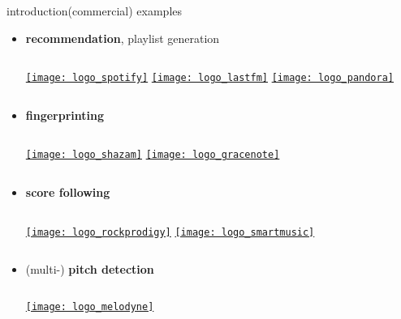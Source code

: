        \begin{frame}{introduction}{(commercial) examples}
            \begin{itemize}
                \item   \textbf{recommendation}, playlist generation
                    \begin{columns}
                            \href{https://www.spotify.com}{\texttt{[image: logo\_spotify]}}
                            \href{https://www.last.fm}{\texttt{[image: logo\_lastfm]}}
                            \href{https://www.pandora.com}{\texttt{[image: logo\_pandora]}}
                    \end{columns}
                \bigskip
                \item<1->   \textbf{fingerprinting} 
                    \begin{columns}
                            \href{https://www.shazam.com}{\texttt{[image: logo\_shazam]}}
                            \href{https://www.gracenote.com}{\texttt{[image: logo\_gracenote]}}
                    \end{columns}
                \bigskip
                \item<1->   \textbf{score following} 
                   \begin{columns}
                            \href{http://www.rockprodigy.com}{\texttt{[image: logo\_rockprodigy]}}
                            \href{https://www.smartmusic.com}{\texttt{[image: logo\_smartmusic]}}
                    \end{columns}
                \bigskip
                \item<1->   (multi-) \textbf{pitch detection} 
                    \begin{columns}
                            \href{http://www.celemony.com}{\texttt{[image: logo\_melodyne]}}
                    \end{columns}
            \end{itemize}
        \end{frame}

